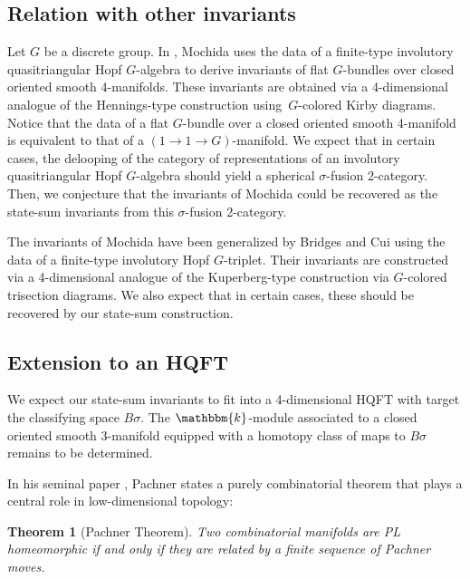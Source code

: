 \documentclass[a4paper, oneside]{amsart}
\makeatletter
\let\origsection\section
\renewcommand\section{\@ifstar{\starsection}{\nostarsection}}
\newcommand\nostarsection[1]
{\sectionprelude\origsection{#1}\sectionpostlude}
\newcommand\starsection[1]
{\sectionprelude\origsection*{#1}\sectionpostlude}
\newcommand\sectionprelude{%
  \vspace{1em}
}
\newcommand\sectionpostlude{%
  \vspace{1em}
}
\numberwithin{equation}{subsection}
\theoremstyle{referencedlemma}
\theoremstyle{plain} %
\newtheorem*{theorem}{Theorem}
\theoremstyle{remark}
\makeatother
\begin{document}
\subsection{Relation with other invariants}

Let $G$ be a discrete group. In \cite{mochidaInvariantsFlatConnections2026}, Mochida uses the data of a finite-type involutory quasitriangular Hopf $G$-algebra to derive invariants of flat $G$-bundles over closed oriented smooth 4-manifolds. These invariants are obtained via a 4-dimensional analogue of the Hennings-type construction using~\mbox{$G$-colored} Kirby diagrams.  Notice that the data of a flat $G$-bundle over a closed oriented smooth 4-manifold is equivalent to that of a $(1\to 1\to G)$-manifold.  We expect that in certain cases,  the delooping of the category of representations of an involutory quasitriangular Hopf $G$-algebra should yield a spherical $\sigma$-fusion 2-category. Then, we conjecture that the invariants of Mochida could  be recovered as the state-sum invariants from this $\sigma$-fusion 2-category. 

The invariants of Mochida have been generalized by Bridges and Cui \cite{bridges_involutory_2025} using the data of a finite-type involutory Hopf $G$-triplet.  Their invariants are constructed via a 4-dimensional analogue of the Kuperberg-type construction via $G$-colored trisection diagrams. We also expect that in certain cases, these should be recovered by our state-sum construction. 

\subsection{Extension to an HQFT}

We expect our state-sum invariants to fit into a 4-dimensional HQFT with target the classifying space $B\sigma$.  The $\mathbbm{k}$-module associated to a closed oriented smooth 3-manifold equipped with a homotopy class of maps to $B\sigma$ remains to be determined. 


\section{Colored Pachner moves}\label{Section-Pachner}

\noindent In his seminal paper \cite{pachner_pl_1991}, Pachner states a purely combinatorial theorem that plays a central role in low-dimensional topology:

\begin{theorem}[Pachner Theorem]
Two combinatorial manifolds are PL homeomorphic if and only if they are related by a finite sequence of Pachner moves. 
\end{theorem}
\end{document}
